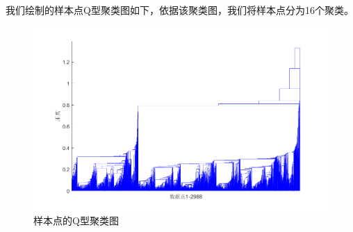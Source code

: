 \documentclass[withoutpreface,bwprint]{cumcmthesis} %
\begin{document}
    \newpage
    \vfill
我们绘制的样本点Q型聚类图如下，依据该聚类图，我们将样本点分为16个聚类。
\vfill
\begin{figure}[H]
    \centering
    \includegraphics[scale=0.6]{样本点的Q型聚类图.png}
    \caption{样本点的Q型聚类图}
    \label{fig:样本点的Q型聚类图}
\end{figure}
\end{document}
